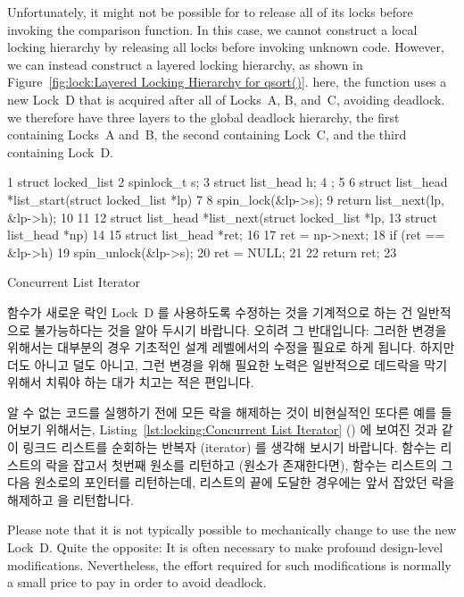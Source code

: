 Unfortunately, it might not be possible for  to release
all of its locks before invoking the comparison function.
In this case, we cannot construct a local locking hierarchy by
releasing all locks before invoking unknown code.
However, we can instead construct a layered locking hierarchy, as shown in
Figure~\ref{fig:lock:Layered Locking Hierarchy for qsort()}.
here, the  function uses a new Lock~D that is acquired after
all of Locks~A, B, and~C, avoiding deadlock.
we therefore have three layers to the global deadlock hierarchy, the
first containing Locks~A and~B, the second containing Lock~C, and
the third containing Lock~D.
\fi

\begin{listing}[tbp]
{ \scriptsize
\begin{verbbox}
  1 struct locked_list {
  2   spinlock_t s;
  3   struct list_head h;
  4 };
  5 
  6 struct list_head *list_start(struct locked_list *lp)
  7 {
  8   spin_lock(&lp->s);
  9   return list_next(lp, &lp->h);
 10 }
 11 
 12 struct list_head *list_next(struct locked_list *lp,
 13                             struct list_head *np)
 14 {
 15   struct list_head *ret;
 16 
 17   ret = np->next;
 18   if (ret == &lp->h) {
 19     spin_unlock(&lp->s);
 20     ret = NULL;
 21   }
 22   return ret;
 23 }
\end{verbbox}
}
\centering
\theverbbox
\caption{Concurrent List Iterator}
\label{lst:locking:Concurrent List Iterator}
\end{listing}

 함수가 새로운 락인 Lock~D 를 사용하도록 수정하는 것을 기계적으로
하는 건 일반적으로 불가능하다는 것을 알아 두시기 바랍니다.
오히려 그 반대입니다: 그러한 변경을 위해서는 대부분의 경우 기초적인 설계
레벨에서의 수정을 필요로 하게 됩니다.
하지만 더도 아니고 덜도 아니고, 그런 변경을 위해 필요한 노력은 일반적으로
데드락을 막기 위해서 치뤄야 하는 대가 치고는 적은 편입니다.

알 수 없는 코드를 실행하기 전에 모든 락을 해제하는 것이 비현실적인 또다른 예를
들어보기 위해서는,
Listing~\ref{lst:locking:Concurrent List Iterator} () 에
보여진 것과 같이 링크드 리스트를 순회하는 반복자 (iterator) 를 생각해 보시기
바랍니다.
 함수는 리스트의 락을 잡고서 첫번째 원소를 리턴하고 (원소가
존재한다면),  함수는 리스트의 그 다음 원소로의 포인터를
리턴하는데, 리스트의 끝에 도달한 경우에는 앞서 잡았던 락을 해제하고 
을 리턴합니다.
\iffalse

Please note that it is not typically possible to mechanically
change  to use the new Lock~D.
Quite the opposite: It is often necessary to make profound design-level
modifications.
Nevertheless, the effort required for such modifications is normally
a small price to pay in order to avoid deadlock.

